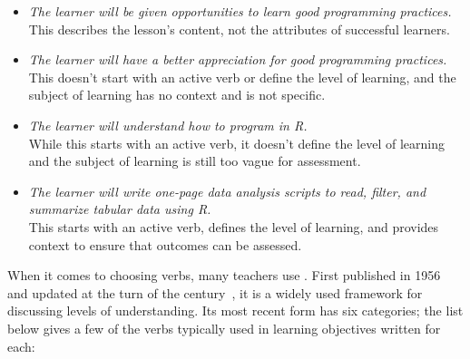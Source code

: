 \begin{itemize}

\item
  \emph{The learner will be given opportunities to learn good programming practices.}\\
  This describes the lesson's content,
  not the attributes of successful learners.\\

\item
  \emph{The learner will have a better appreciation for good programming practices.}\\
  This doesn't start with an active verb or define the level of learning,
  and the subject of learning has no context and is not specific.\\

\item
  \emph{The learner will understand how to program in R.}\\
  While this starts with an active verb,
  it doesn't define the level of learning
  and the subject of learning is still too vague for assessment.\\

\item
  \emph{The learner will write one-page data analysis scripts to read, filter, and summarize tabular data using R.}\\
  This starts with an active verb,
  defines the level of learning,
  and provides context to ensure that outcomes can be assessed.

\end{itemize}

When it comes to choosing verbs,
many teachers use .
First published in 1956 and updated at the turn of the century~\cite{Ande2001},
it is a widely used framework for discussing levels of understanding.
Its most recent form has six categories;
the list below gives a few of the verbs typically used in learning objectives written for each:

